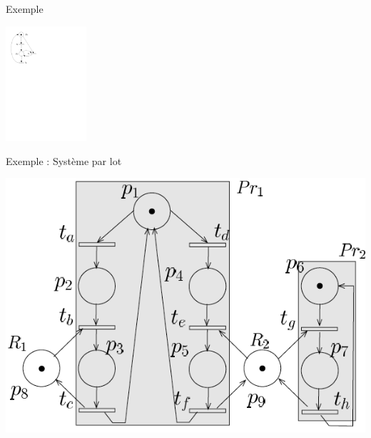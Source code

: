 \documentclass[compress]{beamer}
\begin{document}
\begin{frame}{Exemple}
\begin{center}
	\includegraphics[width=3cm]{exemplea} 
\end{center}
\end{frame}

\begin{frame}{Exemple : Système par lot}
\begin{center}
	\includegraphics[width=.8\linewidth]{rea1}
\end{center}
\end{frame}
\end{document}
